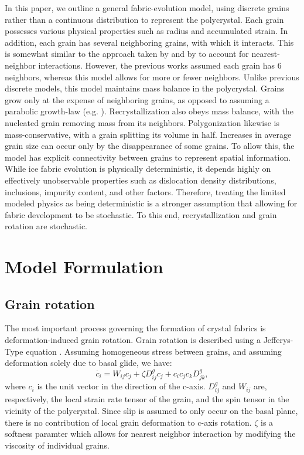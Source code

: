 \documentclass{igs}
\begin{document}
In this paper, we outline a general fabric-evolution model, using discrete grains rather than a continuous distribution to represent the polycrystal. Each grain possesses various physical properties such as radius and accumulated strain. In addition, each grain has several neighboring grains, with which it interacts. This is somewhat similar to the approach taken by \citet{thorsteinsson2002nni} and by \citet{kennedy} to account for nearest-neighbor interactions. However, the previous works assumed each grain has 6 neighbors, whereas this model allows for more or fewer neighbors. Unlike previous discrete models, this model maintains mass balance in the polycrystal. Grains grow only at the expense of neighboring grains, as opposed to assuming a parabolic growth-law (e.g. \citet{gow1969}). Recrystallization also obeys mass balance, with the nucleated grain removing mass from its neighbors. Polygonization likewise is mass-conservative, with a grain splitting its volume in half. Increases in average grain size can occur only by the disappearance of some grains. To allow this, the model has explicit connectivity between grains to represent spatial information. While ice fabric evolution is physically deterministic, it depends highly on effectively unobservable properties such as dislocation density distributions, inclusions, impurity content, and other factors. Therefore, treating the limited modeled physics as being deterministic is a stronger assumption that allowing for fabric development to be stochastic. To this end, recrystallization and grain rotation are stochastic.

\section{Model Formulation}
\subsection{Grain rotation}
The most important process governing the formation of crystal fabrics is deformation-induced grain rotation. Grain rotation is described using a Jefferys-Type equation \citep{azuma94}. Assuming homogeneous stress between grains, and assuming deformation solely due to basal glide, we have:
\begin{equation}
   \dot{c_i} =  W_{ij}  c_j + \zeta D^g_{ij} c_j + c_i c_j c_k D^g_{jk},
\end{equation}
where $c_i$ is the unit vector in the direction of the c-axis. $D^g_{ij}$ and $W_{ij}$ are, respectively, the local strain rate tensor of the grain, and the spin tensor in the vicinity of the polycrystal. Since slip is assumed to only occur on the basal plane, there is no contribution of local grain deformation to c-axis rotation. $\zeta$ is a softness paramter which allows for nearest neighbor interaction by modifying the viscosity of individual grains. 
\end{document}
